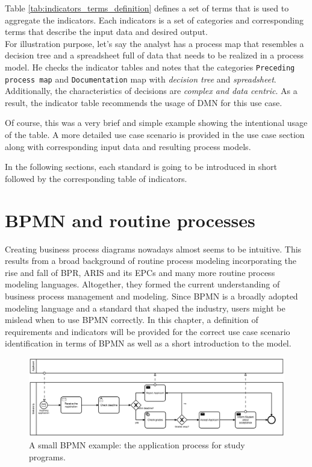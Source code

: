 Table \ref{tab:indicators_terms_definition} defines a set of terms that is used to aggregate the indicators. Each indicators is a set of categories and corresponding terms that describe the input data and desired output. \\
For illustration purpose, let's say the analyst has a process map that resembles a decision tree and a spreadsheet full of data that needs to be realized in a process model. He checks the indicator tables and notes that the categories \texttt{Preceding process map} and \texttt{Documentation} map with \textit{decision tree} and \textit{spreadsheet}. Additionally, the characteristics of decisions are \textit{complex and data centric}. As a result, the indicator table recommends the usage of DMN for this use case. 

Of course, this was a very brief and simple example showing the intentional usage of the table. A more detailed use case scenario is provided in the use case section  along with corresponding input data and resulting process models. 

In the following sections, each standard is going to be introduced in short followed by the corresponding table of indicators. 

\section{BPMN and routine processes}
\label{section:BPMNindicators}
Creating business process diagrams nowadays almost seems to be intuitive. This results from a broad background of routine process modeling incorporating the rise and fall of BPR, ARIS and its EPCs and many more routine process modeling languages. Altogether, they formed the current understanding of business process management and modeling. 
Since BPMN is a broadly adopted modeling language and a standard that shaped the industry, users might be mislead when to use BPMN correctly. In this chapter, a definition of requirements and indicators will be provided for the correct use case scenario identification in terms of BPMN as well as a short introduction to the model. 

\begin{figure}

	\centering
	\includegraphics[scale=0.5]{../figures/chapter_indicators/BPMN_Example_Student_Application.png} 
		\caption{A small BPMN example: the application process for study programs.}
	\label{fig:BPMNex}
\end{figure}

